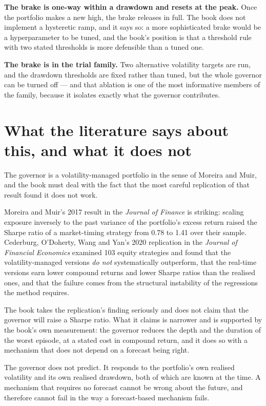 \textbf{The brake is one-way within a drawdown and resets at the peak.}
Once the portfolio makes a new high, the brake releases in full. The
book does not implement a hysteretic ramp, and it says so: a more
sophisticated brake would be a hyperparameter to be tuned, and the book's
position is that a threshold rule with two stated thresholds is more
defensible than a tuned one.

\textbf{The brake is in the trial family.} Two alternative volatility
targets are run, and the drawdown thresholds are fixed rather than tuned,
but the whole governor can be turned off --- and that ablation is one of
the most informative members of the family, because it isolates exactly
what the governor contributes.

\section{What the literature says about this, and what it does not}

The governor is a volatility-managed portfolio in the sense of Moreira and
Muir, and the book must deal with the fact that the most careful
replication of that result found it does not work.

Moreira and Muir's 2017 result in the \emph{Journal of Finance} is
striking: scaling exposure inversely to the past variance of the
portfolio's excess return raised the Sharpe ratio of a market-timing
strategy from 0.78 to 1.41 over their sample. Cederburg, O'Doherty, Wang
and Yan's 2020 replication in the \emph{Journal of Financial Economics}
examined 103 equity strategies and found that the volatility-managed
versions \emph{do not} systematically outperform, that the real-time
versions earn lower compound returns and lower Sharpe ratios than the
realised ones, and that the failure comes from the structural
instability of the regressions the method requires.

The book takes the replication's finding seriously and does not claim
that the governor will raise a Sharpe ratio. What it claims is narrower
and is supported by the book's own measurement: the governor reduces the
depth and the duration of the worst episode, at a stated cost in compound
return, and it does so with a mechanism that does not depend on a
forecast being right.

\begin{takeaway}
The governor does not predict. It responds to the portfolio's own realised
volatility and its own realised drawdown, both of which are known at the
time. A mechanism that requires no forecast cannot be wrong about the
future, and therefore cannot fail in the way a forecast-based mechanism
fails.
\end{takeaway}

